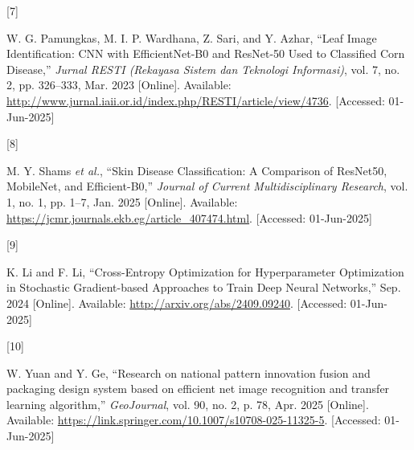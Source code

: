 \documentclass[
  journal,
]{IEEEtran}%
\newlength{\cslhangindent}
\newlength{\csllabelwidth}
\newenvironment{CSLReferences}[2] %
 {\begin{list}{}{%
  \setlength{\itemindent}{0pt}
  \setlength{\leftmargin}{0pt}
  \setlength{\parsep}{0pt}
  \ifodd #1
   \setlength{\leftmargin}{\cslhangindent}
   \setlength{\itemindent}{-1\cslhangindent}
  \fi
  \setlength{\itemsep}{#2\baselineskip}}}
 {\end{list}}
\newcommand{\CSLLeftMargin}[1]{\parbox[t]{\csllabelwidth}{\strut#1\strut}}
\newcommand{\CSLRightInline}[1]{\parbox[t]{\linewidth - \csllabelwidth}{\strut#1\strut}}
\providecommand{\bibfont}{\footnotesize}
\begin{document}
\begin{CSLReferences}{0}{0}
\CSLLeftMargin{{[}7{]} }%
\CSLRightInline{W. G. Pamungkas, M. I. P. Wardhana, Z. Sari, and Y.
Azhar, {``Leaf {Image} {Identification}: {CNN} with {EfficientNet}-{B0}
and {ResNet}-50 {Used} to {Classified} {Corn} {Disease},''} \emph{Jurnal
RESTI (Rekayasa Sistem dan Teknologi Informasi)}, vol. 7, no. 2, pp.
326--333, Mar. 2023 {[}Online{]}. Available:
\url{http://www.jurnal.iaii.or.id/index.php/RESTI/article/view/4736}.
{[}Accessed: 01-Jun-2025{]}}

\CSLLeftMargin{{[}8{]} }%
\CSLRightInline{M. Y. Shams \emph{et al.}, {``Skin {Disease}
{Classification}: {A} {Comparison} of {ResNet50}, {MobileNet}, and
{Efficient}-{B0},''} \emph{Journal of Current Multidisciplinary
Research}, vol. 1, no. 1, pp. 1--7, Jan. 2025 {[}Online{]}. Available:
\url{https://jcmr.journals.ekb.eg/article_407474.html}. {[}Accessed:
01-Jun-2025{]}}

\CSLLeftMargin{{[}9{]} }%
\CSLRightInline{K. Li and F. Li, {``Cross-{Entropy} {Optimization} for
{Hyperparameter} {Optimization} in {Stochastic} {Gradient}-based
{Approaches} to {Train} {Deep} {Neural} {Networks},''} Sep. 2024
{[}Online{]}. Available: \url{http://arxiv.org/abs/2409.09240}.
{[}Accessed: 01-Jun-2025{]}}

\CSLLeftMargin{{[}10{]} }%
\CSLRightInline{W. Yuan and Y. Ge, {``Research on national pattern
innovation fusion and packaging design system based on efficient net
image recognition and transfer learning algorithm,''} \emph{GeoJournal},
vol. 90, no. 2, p. 78, Apr. 2025 {[}Online{]}. Available:
\url{https://link.springer.com/10.1007/s10708-025-11325-5}. {[}Accessed:
01-Jun-2025{]}}

\end{CSLReferences}


\ifCLASSOPTIONcaptionsoff
  \newpage
\fi



\pagebreak[3]
\end{document}
